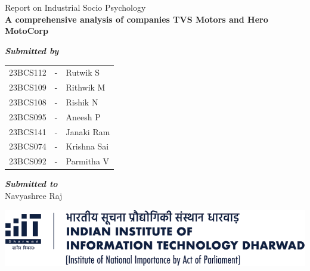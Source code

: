 \begin{titlepage}
\begin{center}
	{\LARGE Report on Industrial Socio Psychology}
	\\[2cm]
	{\Huge \textbf{A comprehensive analysis of companies TVS Motors and Hero MotoCorp}}\\[2.3cm]
	{\Large 
	\textbf{\textit{Submitted by}}\\[0.75cm]
	\begin{tabular}{ccl}
		23BCS112 & - &  Rutwik S      \\
		23BCS109 & - &  Rithwik M     \\
		23BCS108 & - &  Rishik N      \\
		23BCS095 & - &  Aneesh P      \\
		23BCS141 & - &  Janaki Ram    \\
		23BCS074 & - &  Krishna Sai   \\
		23BCS092 & - &  Parmitha V    \\[1.5cm]
	\end{tabular}
	
	\textbf{\textit{Submitted to}}\\[0.75cm]
	Navyashree Raj}
	
	\vfill
	\includegraphics[width=0.8\linewidth]{psycho_images/logo-full-light.png}
	
\end{center}
	
\end{titlepage}